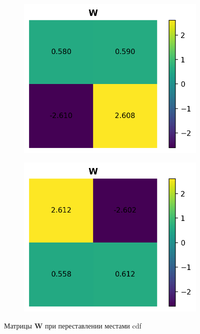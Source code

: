 \documentclass[a4paper,12pt]{article}
\begin{document}
		
	\begin{figure}[h!]
		\centering
		\begin{subfigure}{0.3\linewidth}
			\includegraphics[width=\linewidth]{plots/W3}
		\end{subfigure}
		\begin{subfigure}{0.3\linewidth}
			\includegraphics[width=\linewidth]{plots/W3_flip}
		\end{subfigure}
		\caption{Матрицы $\mathbf{W}$ при переставлении местами cdf}
	\end{figure}
	
\end{document}
